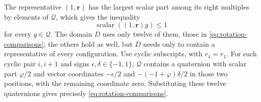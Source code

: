 The representative $(1,\mathbf r)$ has the largest scalar part among its
right multiples by elements of $\mathcal Q$, which gives the inequality
\[
  \operatorname{scalar}((1,\mathbf r)g)\le1
\]
for every $g\in\mathcal Q$. The domain $D$ uses only twelve of them, those
in \cref{eq:rotation-comparisons}; the others hold as well, but $D$ needs
only to contain a representative of every configuration.
Use cyclic subscripts, with $r_4=r_1$.
For each cyclic pair $i,i+1$ and signs $\epsilon,\delta\in\{-1,1\}$,
$\mathcal Q$ contains a quaternion with scalar part $\varphi/2$ and vector
coordinates $-\epsilon/2$ and $-(-1+\varphi)\delta/2$ in those two
positions, with the remaining coordinate zero. Substituting these twelve
quaternions gives precisely \cref{eq:rotation-comparisons}.
